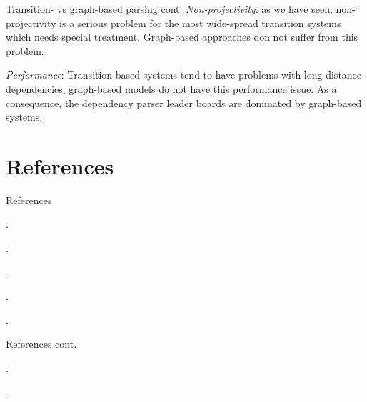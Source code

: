 \documentclass[style=upen, size=14pt]{powerdot}
\newcommand{\gold}{\color{arany}}
\theoremstyle{definition}
\begin{document}
\begin{slide}[toc=]{Transition- vs graph-based parsing cont.}
\emph{\gold Non-projectivity}: as we have seen, non-projectivity is a serious problem
for the most wide-spread transition systems which needs special treatment.
Graph-based approaches don not suffer from this problem.\bigskip

\emph{\gold Performance}: Transition-based systems tend to have problems with
long-distance dependencies, graph-based models do not have this performance
issue. As a consequence, the dependency parser leader boards are dominated by
graph-based systems.
\end{slide}
\section{References}

\begin{slide}{References}
  
  \begin{footnotesize}

    .\medskip

    .\medskip

    .\medskip
    
    .\medskip

    .\medskip
    
  \end{footnotesize}
\end{slide}

\begin{slide}[toc=]{References cont.}
  \begin{footnotesize}

    .\medskip

    .\medskip
    
  \end{footnotesize}
\end{slide}
\end{document}
